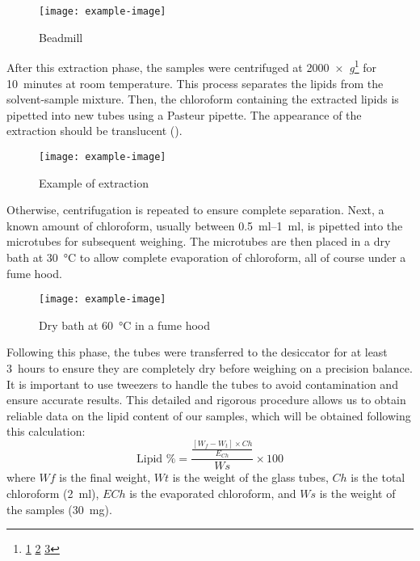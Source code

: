 \begin{figure}[H]
	\centering
	\texttt{[image: example-image]}
	\caption[]{Beadmill}
	\label{fig:}
\end{figure}

After this extraction phase, the samples were centrifuged at 2000~×~\textsl{g}\footnote{\zariv{} \href{https://www.fishersci.it/it/it/scientific-products/centrifuge-guide/centrifuge-applications-tools/rpm-rcf-calculator.html}{1} \href{https://www.sigmaaldrich.com/IT/it/support/calculators-and-apps/g-force-calculator}{2} \href{https://tomy.amuzainc.com/blog/optimizing-centrifuge-speed/}{3}} for \qty{10}{minutes} at room temperature. This process separates the lipids from the solvent-sample mixture. Then, the chloroform containing the extracted lipids is pipetted into new tubes using a Pasteur pipette. The appearance of the extraction should be translucent ().

\begin{figure}[H]
	\centering
	\texttt{[image: example-image]}
	\caption[]{Example of  extraction}
	\label{fig:}
\end{figure}

Otherwise, centrifugation is repeated to ensure complete separation. Next, a known amount of chloroform, usually between \qtyrange{0.5}{1}{\milli\litre}, is pipetted into the microtubes for subsequent weighing. The microtubes are then placed in a dry bath at \qty{30}{\degreeCelsius} to allow complete evaporation of chloroform, all of course under a fume hood.

\begin{figure}[H]
	\centering
	\texttt{[image: example-image]}
	\caption[]{Dry bath at \qty{60}{\degreeCelsius} in a fume hood}
	\label{fig:}
\end{figure}

Following this phase, the tubes were transferred to the desiccator for at least \qty{3}{hours} to ensure they are completely dry before weighing on a precision balance. It is important to use tweezers to handle the tubes to avoid contamination and ensure accurate results. This detailed and rigorous procedure allows us to obtain reliable data on the lipid content of our samples, which will be obtained following this calculation:\zariv{}
\[
	\text{Lipid \%}
	=
	\frac
		{\frac{[W_f - W_t] \times Ch}{E_{Ch}}}
		{Ws}
		\times 100
\]
where $ Wf $ is the final weight, $ Wt $ is the weight of the glass tubes, $ Ch $ is the total chloroform (\qty{2}{\milli\litre}), $ ECh $ is the evaporated chloroform, and $ Ws $ is the weight of the samples (\qty{30}{\milli\gram}).

